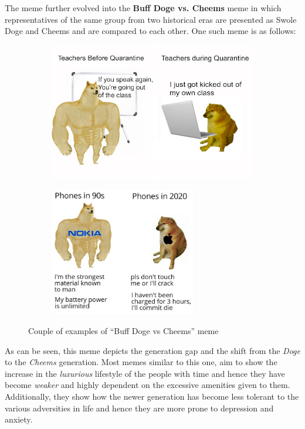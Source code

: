 \documentclass{article}
\begin{document}
The meme further evolved into the \textbf{Buff Doge vs. Cheems} meme in which representatives of the same group from two historical eras are presented as Swole Doge and Cheems and are compared to each other. One such meme is as follows:
\begin{figure}[H]
    \begin{subfigure}{0.45\textwidth}
        \centering
        \includegraphics[width=\textwidth]{figures/cheems_2.jpg}
    \end{subfigure}
    \begin{subfigure}{0.45\textwidth}
        \centering
        \includegraphics[width=0.7\textwidth]{figures/cheems_3.jpg}
    \end{subfigure}
    \caption{Couple of examples of ``Buff Doge vs Cheems'' meme}
\end{figure}

As can be seen, this meme depicts the generation gap and the shift from the \textit{Doge} to the \textit{Cheems} generation. Most memes similar to this one, aim to show the increase in the \textit{luxurious} lifestyle of the people with time and hence they have become \textit{weaker} and highly dependent on the excessive amenities given to them. Additionally, they show how the newer generation has become less tolerant to the various adversities in life and hence they are more prone to depression and anxiety.
\end{document}
